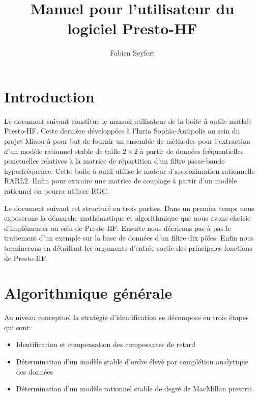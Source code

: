 \documentclass[12]{article}
\def\prest{Presto-HF\xspace}
\begin{document}
\title{Manuel pour l'utilisateur du logiciel \prest}
\author{Fabien Seyfert}
\maketitle


\tableofcontents
\newpage

\section{Introduction}

Le document suivant constitue le manuel utilisateur de la boite \`a
outils matlab \prest. Cette derni\`ere d\'evelopp\'ees \`a l'Inria
Sophia-Antipolis au sein du projet Miaou \`a pour but de fournir un
ensemble de m\'ethodes pour l'extraction d'un mod\`ele rationnel stable de
taille $2 \times 2$ \` a partir de donn\'ees fr\'equentielles ponctuelles
relatives \`a la matrice de r\'epartition d'un filtre
passe-bande hyperfr\'equence. Cette boite \`a outil utilise le moteur
d'approximation rationnelle RARL2. Enfin pour extraire une matrice de
couplage \`a partir d'un mod\`ele rationnel on pourra utiliser RGC.

Le document suivant est structur\'e en trois parties. Dans un premier
temps nous exposerons la d\'emarche math\'ematique et algorithmique que
nous avons choisie d'impl\'ementer au sein de \prest. Ensuite nous
d\'ecrirons pas \`a pas  le traitement d'un exemple sur la base de donn\'ees
d'un filtre dix p\^oles. Enfin nous terminerons en d\'etaillant les
arguments d'entr\'ee-sortie des principales fonctions de \prest.        

\section{Algorithmique g\'en\'erale}

Au niveau conceptuel la strat\'egie d'identification se d\'ecompose en
trois \'etapes qui sont:
\begin{itemize}

\item Identification et compensation des composantes de retard
\item D\'etermination d'un mod\`ele stable d'ordre \'elev\'e par
  compl\'etion analytique des donn\'ees 
\item D\'etermination d'un mod\`ele rationnel stable de degr\'e de MacMillan
  prescrit.
\end{itemize}
\end{document}
